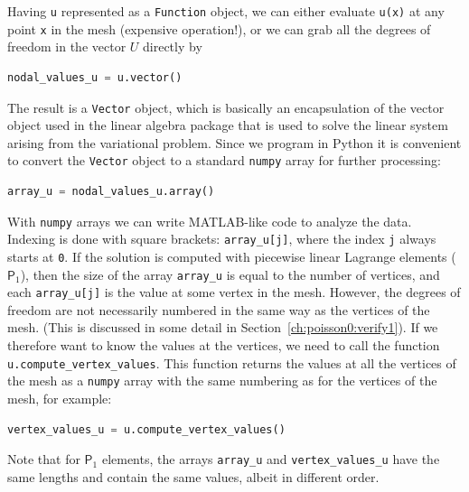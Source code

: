 \documentclass[graybox,envcountchap,sectrefs,final]{svmonodo}
\begin{document}
Having \texttt{u} represented as a \texttt{Function} object, we can either evaluate
\texttt{u(x)} at any point \texttt{x} in the mesh (expensive operation!), or we can
grab all the degrees of freedom in the vector $U$ directly by

\begin{lstlisting}[language=Python,style=graycolor]
nodal_values_u = u.vector()
\end{lstlisting}
The result is a \texttt{Vector} object, which is basically an encapsulation
of the vector object used in the linear algebra package that is used
to solve the linear system arising from the variational problem.
Since we program in Python it is convenient to convert the \texttt{Vector}
object to a standard \texttt{numpy} array for further processing:


\begin{lstlisting}[language=Python,style=graycolor]
array_u = nodal_values_u.array()
\end{lstlisting}

With \texttt{numpy} arrays we can write MATLAB-like code to analyze the
data. Indexing is done with square brackets: \Verb!array_u[j]!, where the
index \texttt{j} always starts at \texttt{0}. If the solution is computed with
piecewise linear Lagrange elements ($\mathsf{P}_1$), then the size of
the array \Verb!array_u! is equal to the number of vertices, and each
\Verb!array_u[j]! is the value at some vertex in the mesh. However, the degrees
of freedom are not necessarily numbered in the same way as the
vertices of the
mesh. (This is discussed in some detail in Section~\ref{ch:poisson0:verify1}).
If we therefore want to know the values at the vertices, we need to
call the function \Verb!u.compute_vertex_values!. This function returns
the values at all the vertices of the mesh as a \texttt{numpy} array with the same
numbering as for the vertices of the mesh, for example:

\begin{lstlisting}[language=Python,style=graycolor]
vertex_values_u = u.compute_vertex_values()
\end{lstlisting}
Note that for $\mathsf{P}_1$ elements, the arrays \Verb!array_u! and \Verb!vertex_values_u! have the same lengths and contain the same values, albeit in different order.


\end{document}
